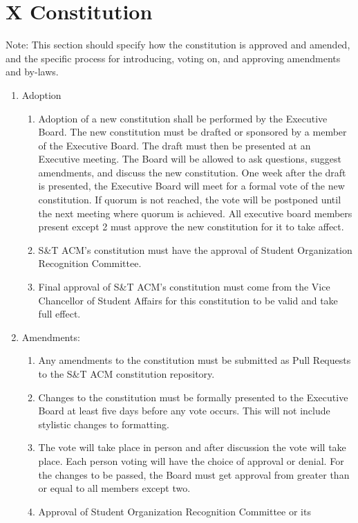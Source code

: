 
\section{X \textendash{} Constitution}
Note:  This section should specify how the constitution is approved and amended,
and the specific process for introducing, voting on, and approving amendments
and by-laws.
\begin{enumerate}
  \item Adoption
    \begin{enumerate}
      \item Adoption of a new constitution shall be performed by the Executive
        Board. The new constitution must be drafted or sponsored by a member of
        the Executive Board. The draft must then be presented at an Executive
        meeting. The Board will be allowed to ask questions, suggest amendments,
        and discuss the new constitution. One week after the draft is presented,
        the Executive Board will meet for a formal vote of the new constitution.
        If quorum is not reached, the vote will be postponed until the next
        meeting where quorum is achieved. All executive board members present
        except 2 must approve the new constitution for it to take affect.
      \item	S\&T ACM’s constitution must have the approval of Student
        Organization Recognition Committee.
      \item	Final approval of S\&T ACM’s constitution must come from the Vice
        Chancellor of Student Affairs for this constitution to be valid and take
        full effect.
    \end{enumerate}
  \item	Amendments:
    \begin{enumerate}
      \item Any amendments to the constitution must be submitted as Pull
      Requests to the S\&T ACM constitution repository.
      \item Changes to the constitution must be formally presented to the
      Executive Board at least five days before any vote occurs. This will not
      include stylistic changes to formatting.
      \item The vote will take place in person and after discussion the vote
        will take place. Each person voting will have the choice of approval or
        denial. For the changes to be passed, the Board must get approval from
        greater than or equal to all members except two.
      \item	Approval of Student Organization Recognition Committee or its

\end{enumerate}
\end{enumerate}
